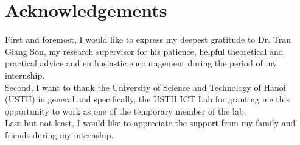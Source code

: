 \chapter*{Acknowledgements}

First and foremost, I would like to express my deepest gratitude to Dr. Tran Giang Son, my research supervisor for his patience, helpful theoretical and practical advice and enthusiastic encouragement during the period of my internship. \\
Second, I want to thank the University of Science and Technology of Hanoi (USTH) in general and specifically, the USTH ICT Lab for granting me this opportunity to work as one of the temporary member of the lab. \\
Last but not least, I would like to appreciate the support from my family and friends during my internship. \\
